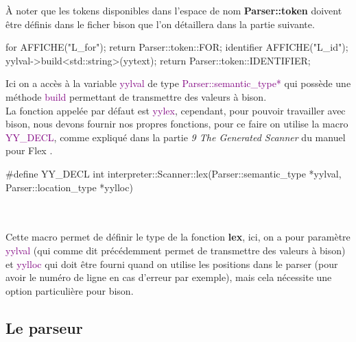 \documentclass[a4paper]{article}%
\begin{document}
À noter que les tokens disponibles dans l'espace de nom \textbf{Parser::token}
doivent être définis dans le ficher bison que l'on détaillera dans la partie
suivante.

\begin{code}
for          { AFFICHE("L_for"); return Parser::token::FOR; }
{identifier} {
  AFFICHE("L_id");
  yylval->build<std::string>(yytext);
  return Parser::token::IDENTIFIER;
}
\end{code}\leavevmode\newline

\noindent

Ici on a accès à la variable \textcolor{purple}{yylval} de type
\textcolor{purple}{Parser::semantic\_type*} qui possède une méthode
\textcolor{purple}{build} permettant de transmettre des valeurs à bison.\\


La fonction appelée par défaut est \textcolor{purple}{yylex}, cependant, pour
pouvoir travailler avec bison, nous devons fournir nos propres fonctions, pour
ce faire on utilise la macro \textcolor{purple}{YY\_DECL}, comme expliqué dans
la partie \textit{9 The Generated Scanner} du manuel pour Flex
\cite{flexmanual}.

\begin{code}
#define YY_DECL int interpreter::Scanner::lex(Parser::semantic_type *yylval, Parser::location_type *yylloc)
\end{code}\leavevmode\\~\\

Cette macro permet de définir le type de la fonction \textbf{lex}, ici,
on a pour paramètre \textcolor{purple}{yylval} (qui comme dit précédemment permet
de transmettre des valeurs à bison) et \textcolor{purple}{yylloc} qui doit être
fourni quand on utilise les positions dans le \gls{parser} (pour avoir le numéro de
ligne en cas d'erreur par exemple), mais cela nécessite une option particulière
pour bison.

\clearpage{}

\subsection{Le parseur}
\end{document}
